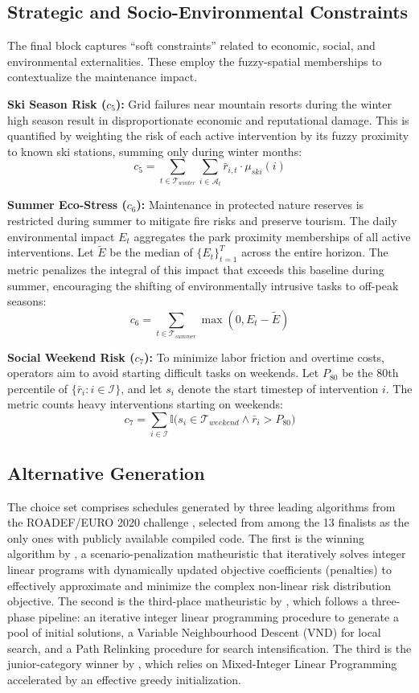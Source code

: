\subsection{Strategic and Socio-Environmental Constraints}

The final block captures ``soft constraints'' related to economic, social, and environmental externalities. These employ the fuzzy-spatial memberships to contextualize the maintenance impact.

\textbf{Ski Season Risk ($c_5$):} Grid failures near mountain resorts during the winter high season result in disproportionate economic and reputational damage. This is quantified by weighting the risk of each active intervention by its fuzzy proximity to known ski stations, summing only during winter months:
\[
c_5 = \sum_{t \in \mathcal{T}_{winter}} \sum_{i \in \mathcal{A}_t} \bar{r}_{i,t} \cdot \mu_{ski}(i)
\]

\textbf{Summer Eco-Stress ($c_6$):} Maintenance in protected nature reserves is restricted during summer to mitigate fire risks and preserve tourism. The daily environmental impact $E_t$ aggregates the park proximity memberships of all active interventions. Let $\tilde{E}$ be the median of $\{E_t\}_{t=1}^{T}$ across the entire horizon. The metric penalizes the integral of this impact that exceeds this baseline during summer, encouraging the shifting of environmentally intrusive tasks to off-peak seasons:
\[
c_6 = \sum_{t \in \mathcal{T}_{summer}} \max(0, E_t - \tilde{E})
\]

\textbf{Social Weekend Risk ($c_7$):} To minimize labor friction and overtime costs, operators aim to avoid starting difficult tasks on weekends. Let $P_{80}$ be the 80th percentile of $\{\bar{r}_i : i \in \mathcal{I}\}$, and let $s_i$ denote the start timestep of intervention $i$. The metric counts heavy interventions starting on weekends:
\[
c_7 = \sum_{i \in \mathcal{I}} \mathbb{I}\bigl(s_i \in \mathcal{T}_{weekend} \land \bar{r}_i > P_{80}\bigr)
\]

\subsection{Alternative Generation}

The choice set comprises schedules generated by three leading algorithms from the ROADEF/EURO 2020 challenge \cite{roadef2020}, selected from among the 13 finalists as the only ones with publicly available compiled code. The first is the winning algorithm by \citet{top1roadef}, a scenario-penalization matheuristic that iteratively solves integer linear programs with dynamically updated objective coefficients (penalties) to effectively approximate and minimize the complex non-linear risk distribution objective. The second is the third-place matheuristic by \citet{Consueloroadef}, which follows a three-phase pipeline: an iterative integer linear programming procedure to generate a pool of initial solutions, a Variable Neighbourhood Descent (VND) for local search, and a Path Relinking procedure for search intensification. The third is the junior-category winner by \citet{top5roadef}, which relies on Mixed-Integer Linear Programming accelerated by an effective greedy initialization.

